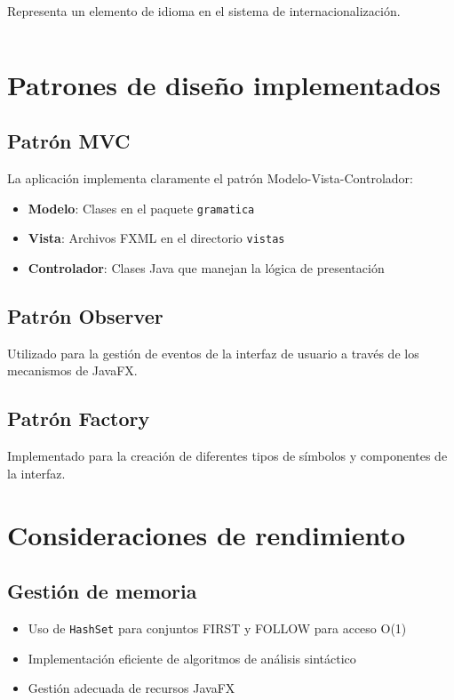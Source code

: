 Representa un elemento de idioma en el sistema de internacionalización.

\inputminted[linenos,breaklines,firstline=1,lastline=25]{java}{codigo/src/utils/LanguageItem.java}

\section{Patrones de diseño implementados}

\subsection{Patrón MVC}

La aplicación implementa claramente el patrón Modelo-Vista-Controlador:

\begin{itemize}
    \item \textbf{Modelo}: Clases en el paquete \texttt{gramatica}
    \item \textbf{Vista}: Archivos FXML en el directorio \texttt{vistas}
    \item \textbf{Controlador}: Clases Java que manejan la lógica de presentación
\end{itemize}

\subsection{Patrón Observer}

Utilizado para la gestión de eventos de la interfaz de usuario a través de los mecanismos de JavaFX.

\subsection{Patrón Factory}

Implementado para la creación de diferentes tipos de símbolos y componentes de la interfaz.

\section{Consideraciones de rendimiento}

\subsection{Gestión de memoria}

\begin{itemize}
    \item Uso de \texttt{HashSet} para conjuntos FIRST y FOLLOW para acceso O(1)
    \item Implementación eficiente de algoritmos de análisis sintáctico
    \item Gestión adecuada de recursos JavaFX
\end{itemize}

